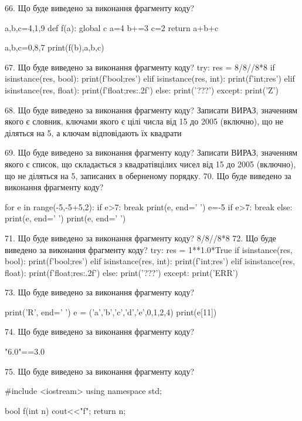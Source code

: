 \documentclass[11pt]{article}
\begin{document}
66. Що буде виведено за виконання фрагменту коду?

a,b,c=4,1,9
def f(a):
global c    a=4
    b+=3
    c=2
    return a+b+c

a,b,c=0,8,7
print(f(b),a,b,c)

67. Що буде виведено за виконання фрагменту коду?
try:
    res = 8/8//8*8
    if isinstance(res, bool):
        print(f'bool;{res}')
    elif isinstance(res, int):
        print(f'int;{res}')
    elif isinstance(res, float):
        print(f'float;{res:.2f}')
    else:
        print('???')
except:
    print('Z')

68. Що буде виведено за виконання фрагменту коду?
Записати ВИРАЗ, значенням якого є словник, ключами якого є цілі числа від 15 до 2005 (включно), що не діляться на 5, а ключам відповідають їх квадрати 

69. Що буде виведено за виконання фрагменту коду?
Записати ВИРАЗ, значенням якого є список, що складається з квадратівцілих чисел від 15 до 2005 (включно), що не діляться на 5, записаних в оберненому порядку.
70. Що буде виведено за виконання фрагменту коду?

for e in range(-5,-5+5,2):
    if e>7:
        break
    print(e, end=' ')
    e=-5
    if e>7:
        break
else:
    print(e, end=' ')
print(e, end=' ')

71. Що буде виведено за виконання фрагменту коду?
8/8//8*8
72. Що буде виведено за виконання фрагменту коду?
try:
    res = 1**1.0*True
    if isinstance(res, bool):
        print(f'bool;{res}')
    elif isinstance(res, int):
        print(f'int;{res}')
    elif isinstance(res, float):
        print(f'float;{res:.2f}')
    else:
        print('???')
except:
    print('ERR')

73. Що буде виведено за виконання фрагменту коду?

print('R', end=' ')
e = ('a','b','c','d','e',0,1,2,4)
print(e[11])


74. Що буде виведено за виконання фрагменту коду?

"6.0"==3.0

75. Що буде виведено за виконання фрагменту коду?

#include <iostream>
using namespace std;

bool f(int n){
    cout<<"f";
    return n;
}
\end{document}
